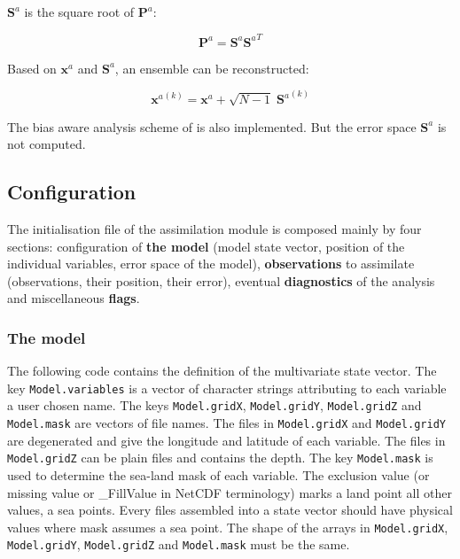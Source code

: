 \documentclass[a4paper,12pt]{article}
\newcommand{\code}{\texttt}
\begin{document}
 
$\mathbf S^a$ is the square root of $\mathbf P^a$:

\begin{equation}
\mathbf P^a = \mathbf S^a {\mathbf S^a}^T
\end{equation}

Based on $\mathbf x^a$ and $\mathbf S^a$, an ensemble can be reconstructed:

\begin{equation}
{\mathbf x^a}^{(k)} = \mathbf x^a + {\sqrt{N-1}} \; {\mathbf S^a}^{(k)}
\end{equation}

The bias aware analysis scheme of \citet{dee98} is also implemented. But the error space $\mathbf S^a$ is not computed.

\subsection{Configuration}\label{sec_config}

The initialisation file of the assimilation module is composed mainly
by four sections: configuration of \textbf{the model} (model state vector,
position of the individual variables, error space of the model),
\textbf{observations} to assimilate (observations, their position, their
error), eventual \textbf{diagnostics} of the analysis and
miscellaneous \textbf{flags}.

\subsubsection{The model}

The following code contains the definition of the multivariate state
vector. The key \code{Model.variables} is a vector of character
strings attributing to each variable a user chosen name. The keys
\code{Model.gridX}, \code{Model.gridY}, \code{Model.gridZ} and
\code{Model.mask} are vectors of file names. The files in \code{Model.gridX} and 
\code{Model.gridY} are degenerated and give the longitude and latitude
of each variable. The files in \code{Model.gridZ} can be plain files
and contains the depth. The key \code{Model.mask} is used to determine
the sea-land mask of each variable. The exclusion value (or missing
value or \_FillValue in NetCDF terminology) marks a land point all other values, a sea
points. Every files assembled into a state vector should have physical
values where mask assumes a sea point. The shape of the arrays in
\code{Model.gridX}, \code{Model.gridY}, \code{Model.gridZ} and
\code{Model.mask} must be the same. 
\\
\end{document}

